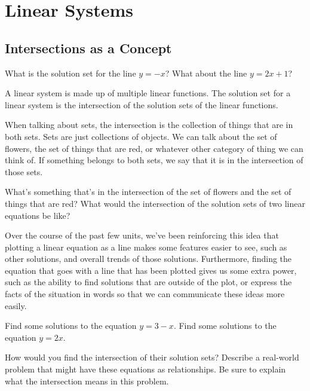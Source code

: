 \chapter{Linear Systems}
\section{Intersections as a Concept}

\begin{recall}
What is the solution set for the line $y=-x$? What about the line $y=2x+1$?
\end{recall}


\begin{defn}
A linear system is made up of multiple linear functions. The solution set for a linear system is the intersection of the solution sets of the linear functions. 
\end{defn}

When talking about sets, the intersection is the collection of things that are in both sets.  Sets are just collections of objects.  We can talk about the set of flowers, the set of things that are red, or whatever other category of thing we can think of.  If something belongs to both sets, we say that it is in the intersection of those sets.  

\begin{prblm}
What's something that's in the intersection of the set of flowers and the set of things that are red?
What would the intersection of the solution sets of two linear equations be like?
\end{prblm}

Over the course of the past few units, we've been reinforcing this idea that plotting a linear equation as a line makes some features easier to see, such as other solutions, and overall trends of those solutions.  Furthermore, finding the equation that goes with a line that has been plotted gives us some extra power, such as the ability to find solutions that are outside of the plot, or express the facts of the situation in words so that we can communicate these ideas more easily.

\begin{problem}
Find some solutions to the equation $y = 3 - x$.
Find some solutions to the equation $y = 2x$.

How would you find the intersection of their solution sets?
Describe a real-world problem that might have these equations as relationships.  Be sure to explain what the intersection means in this problem.
\end{problem}

